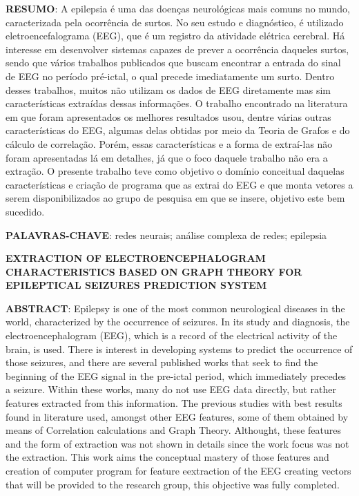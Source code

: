 \documentclass[a4paper,11pt]{article} %
\begin{document}






\vspace{0.5cm}
\noindent\textbf{RESUMO}: A epilepsia é uma das doenças neurológicas mais comuns no mundo, caracterizada pela ocorrência de surtos. No seu estudo e diagnóstico, é utilizado  eletroencefalograma (EEG), que é um registro da atividade elétrica cerebral. Há interesse em desenvolver sistemas capazes de prever a ocorrência daqueles surtos, sendo que vários trabalhos publicados que buscam encontrar a entrada do sinal de EEG no período pré-ictal, o qual precede imediatamente um surto. Dentro desses trabalhos, muitos não utilizam os dados de EEG diretamente mas sim características extraídas dessas informações. O trabalho encontrado na literatura em que foram apresentados os melhores resultados usou, dentre várias outras características do EEG, algumas delas obtidas por meio da Teoria de Grafos e do cálculo de correlação. Porém, essas características e a forma de extraí-las não foram apresentadas lá em detalhes, já que o foco daquele trabalho não era a extração. O presente trabalho teve como objetivo o domínio conceitual daquelas características e criação de programa que as extrai do EEG e que monta vetores a serem disponibilizados ao grupo de pesquisa em que se insere, objetivo este bem sucedido.

\vspace{0.5cm}
\noindent\textbf{PALAVRAS-CHAVE}: redes neurais; análise complexa de redes; epilepsia

\vspace{0.5cm}
 \begin{center}
 \textbf{EXTRACTION OF ELECTROENCEPHALOGRAM CHARACTERISTICS BASED ON GRAPH THEORY FOR EPILEPTICAL SEIZURES PREDICTION SYSTEM}
 \end{center}

\noindent\textbf{ABSTRACT}: Epilepsy is one of the most common neurological diseases in the world, characterized by the occurrence of seizures. In its study and diagnosis, the electroencephalogram (EEG), which is a record of the electrical activity of the brain, is used. There is interest in developing systems to predict the occurrence of those seizures, and there are several published works that seek to find the beginning of the EEG signal in the pre-ictal period, which immediately precedes a seizure. Within these works, many do not use EEG data directly, but rather features extracted from this information. The previous studies with best results found in literature used, amongst other EEG features, some of them obtained by means of Correlation calculations and Graph Theory. Althought, these features and the form of extraction was not shown in details since the work focus was not the extraction. This work aims the conceptual mastery of those features and creation of computer program for feature eextraction of the EEG creating vectors that will be provided to the research group, this objective was fully completed.
\end{document}
